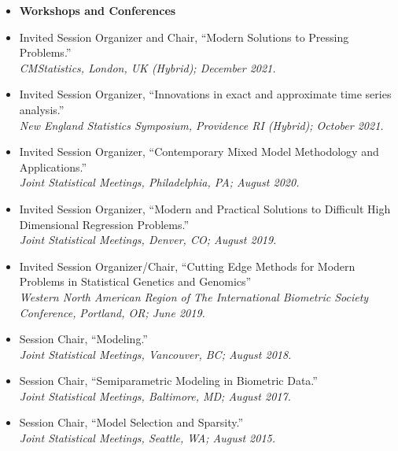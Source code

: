 \documentclass[11pt]{article}
\newcommand{\tab}{\hspace*{2em}}
\begin{document}
\begin{itemize} 
	\item[] \textbf{Workshops and Conferences}  \vspace{-2mm}
	\item[] Invited Session Organizer and Chair, ``Modern Solutions to Pressing Problems.'' \hfill   \\
	\tab \emph{CMStatistics, London, UK (Hybrid); December 2021.}  \vspace{-2mm}
	\item[] Invited Session Organizer, ``Innovations in exact and approximate time series analysis.'' \hfill   \\
	\tab \emph{New England Statistics Symposium, Providence RI (Hybrid); October 2021.}  \vspace{-2mm}
	\item[] Invited Session Organizer, ``Contemporary Mixed Model Methodology and Applications.'' \hfill   \\
	\tab \emph{Joint Statistical Meetings, Philadelphia, PA; August 2020.}  \vspace{-2mm}
	\item[] Invited Session Organizer, ``Modern and Practical Solutions to Difficult High Dimensional Regression Problems.'' \hfill   \\
	\tab \emph{Joint Statistical Meetings, Denver, CO; August 2019.}  \vspace{-2mm}
	\item[] Invited Session Organizer/Chair, ``Cutting Edge Methods for Modern Problems in Statistical Genetics and Genomics'' \hfill   \\
	\tab \emph{Western North American Region of The International Biometric Society Conference,} 
	\tab \emph{Portland, OR; June 2019.}  \vspace{-2mm}
	\item[] Session Chair, ``Modeling.'' \hfill   \\
	\tab \emph{Joint Statistical Meetings, Vancouver, BC; August 2018.}  \vspace{-2mm}
	\item[] Session Chair, ``Semiparametric Modeling in Biometric Data.'' \hfill   \\
	\tab \emph{Joint Statistical Meetings, Baltimore, MD; August 2017.}  \vspace{-2mm}
	\item[] Session Chair, ``Model Selection and Sparsity.'' \hfill   \\
	\tab \emph{Joint Statistical Meetings, Seattle, WA; August 2015.}  \vspace{-2mm}
\end{itemize}
\end{document}
